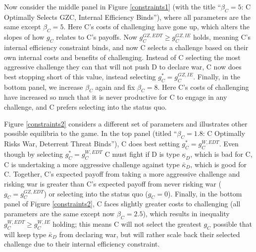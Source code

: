 \documentclass[11pt,letterpaper,pdftex,dvipsnames,table]{article}
\begin{document}
Now consider the middle panel in Figure \ref{constraints1} (with the title ``$\beta_{C}=5$: C Optimally Selects GZC, Internal Efficiency Binds''), where all parameters are the same except $\beta_{C}=5$. Here C's costs of challenging have gone up, which alters the slopes of how $g_C$ relates to C's payoffs. Now $g_{C}^{GZ,EDT}\geq g_{C}^{GZ,IE}$ holds, meaning C's internal efficiency constraint binds, and now C selects a challenge based on their own internal costs and benefits of challenging. Instead of C selecting the most aggressive challenge they can that will not push D to declare war, C now does best stopping short of this value, instead selecting $g_{C}^{*}=g_{C}^{GZ,IE}$. Finally, in the bottom panel, we increase $\beta_C$ again and fix $\beta_{C}=8$. Here C's costs of challenging have increased so much that it is never productive for C to engage in any challenge, and C prefers selecting into the status quo.

Figure \ref{constraints2} considers a different set of parameters and illustrates other possible equilibria to the game. In the top panel (titled ``$\beta_{C}=1.8$: C Optimally Risks War, Deterrent Threat Binds''), C does best setting $g_{C}^{*}=g_{C}^{W,EDT}$. Even though by selecting $g_{C}^{*}=g_{C}^{W,EDT}$ C must fight if D is type $\underline{\kappa}_{D}$, which is bad for C, C is undertaking a more aggressive challenge against type $\bar{\kappa}_{D}$, which is good for C. Together, C's expected payoff from taking a more aggressive challenge and risking war is greater than C's expected payoff from never risking war ($g_{C}=g_{C}^{GZ,EDT}$) or selecting into the status quo ($g_{C}=0$). Finally, in the bottom panel of Figure \ref{constraints2}, C faces slightly greater costs to challenging (all parameters are the same except now $\beta_{C}=2.5$), which results in inequality $g_{C}^{W,EDT}\geq g_{C}^{W,IE}$ holding; this means C will not select the greatest $g_{C}$ possible that will keep type $\bar{\kappa}_{D}$ from declaring war, but will rather scale back their selected challenge due to their internal efficiency constraint.
\end{document}
